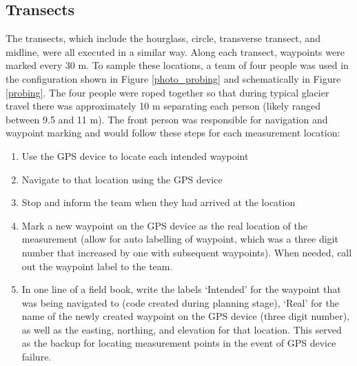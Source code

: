 \documentclass[12pt]{article}
\begin{document}
\subsection{Transects}
\label{sec:transects}

The transects, which include the hourglass, circle, transverse transect, and midline, were all executed in a similar way. Along each transect, waypoints were marked every 30 m. To sample these locations, a team of four people was used in the configuration shown in Figure \ref{photo_probing} and schematically in Figure \ref{probing}. The four people were roped together so that during typical glacier travel there was approximately 10 m separating each person (likely ranged between 9.5 and 11 m). The front person was responsible for navigation and waypoint marking and would follow these steps for each measurement location:
\begin{enumerate}
\item Use the GPS device to locate each intended waypoint
\item Navigate to that location using the GPS device
\item Stop and inform the team when they had arrived at the location
\item Mark a new waypoint on the GPS device as the real location of the measurement (allow for auto labelling of waypoint, which was a three digit number that increased by one with subsequent waypoints). When needed, call out the waypoint label to the team.
\item In one line of a field book, write the labels `Intended' for the waypoint that was being navigated to (code created during planning stage), `Real' for the name of the newly created waypoint on the GPS device (three digit number), as well as the easting, northing, and elevation for that location. This served as the backup for locating measurement points in the event of GPS device failure. 
\end{enumerate}
\end{document}
